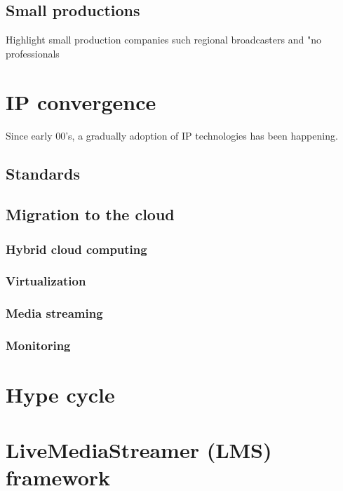 \subsection{Small productions}

Highlight small production companies such regional broadcasters and "no professionals


\section{IP convergence}

Since early 00’s, a gradually adoption of IP technologies has been happening.

\subsection{Standards}


\subsection{Migration to the cloud}


\subsubsection{Hybrid cloud computing}


\subsubsection{Virtualization}


\subsubsection{Media streaming}


\subsubsection{Monitoring}


\section{Hype cycle}


\section{LiveMediaStreamer (LMS) framework}







